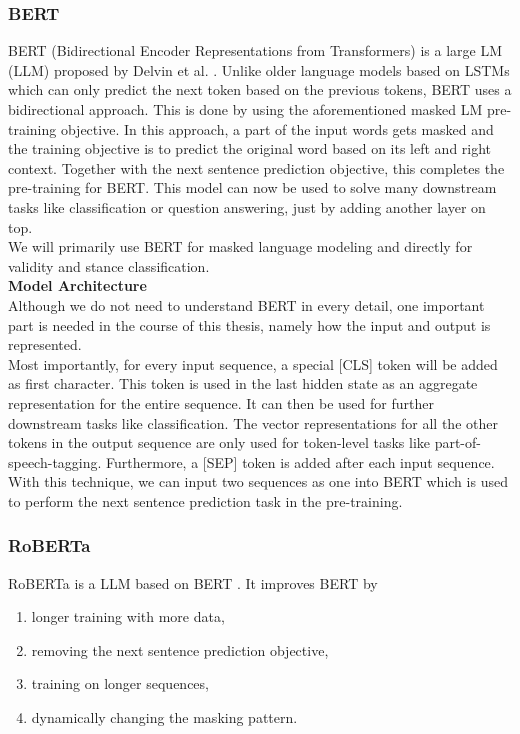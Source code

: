 \subsubsection{BERT}
BERT (Bidirectional Encoder Representations from Transformers) is a large LM (LLM) proposed by Delvin et al. \cite{bert}. Unlike older language models based on LSTMs which can only predict the next token based on the previous tokens, BERT uses a bidirectional approach. This is done by using the aforementioned masked LM pre-training objective. In this approach, a part of the input words gets masked and the training objective is to predict the original word based on its left and right context. Together with the next sentence prediction objective, this completes the pre-training for BERT. This model can now be used to solve many downstream tasks like classification or question answering, just by adding another layer on top. \\
We will primarily use BERT for masked language modeling and directly for validity and stance classification. \\

\textbf{Model Architecture} \\
Although we do not need to understand BERT in every detail, one important part is needed in the course of this thesis, namely how the input and output is represented. \\
Most importantly, for every input sequence, a special [CLS] token will be added as first character. This token is used in the last hidden state as an aggregate representation for the entire sequence. It can then be used for further downstream tasks like classification. The vector representations for all the other tokens in the output sequence are only used for token-level tasks like part-of-speech-tagging. Furthermore, a [SEP] token is added after each input sequence. With this technique, we can input two sequences as one into BERT which is used to perform the next sentence prediction task in the pre-training.


\subsubsection{RoBERTa}
RoBERTa is a LLM based on BERT \cite{roberta}. It improves BERT by
\begin{enumerate}
	\item longer training with more data,
	\item removing the next sentence prediction objective,
	\item training on longer sequences,
	\item dynamically changing the masking pattern.
\end{enumerate}

